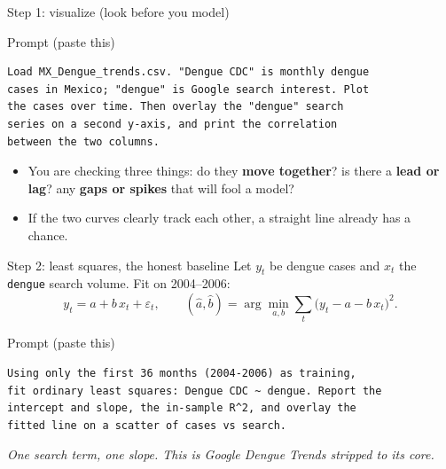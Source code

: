 \documentclass[aspectratio=169,11pt]{beamer}
\begin{document}
\begin{frame}[fragile]{Step 1: visualize (look before you model)}
  \begin{block}{Prompt (paste this)}
  \begin{lstlisting}
Load MX_Dengue_trends.csv. "Dengue CDC" is monthly dengue
cases in Mexico; "dengue" is Google search interest. Plot
the cases over time. Then overlay the "dengue" search
series on a second y-axis, and print the correlation
between the two columns.
  \end{lstlisting}
  \end{block}
  \begin{itemize}
    \item You are checking three things: do they \textbf{move together}? is there a
          \textbf{lead or lag}? any \textbf{gaps or spikes} that will fool a model?
    \item If the two curves clearly track each other, a straight line already has a chance.
  \end{itemize}
\end{frame}

\begin{frame}[fragile]{Step 2: least squares, the honest baseline}
  Let $y_t$ be dengue cases and $x_t$ the \texttt{dengue} search volume. Fit on
  2004--2006:
  \[
    y_t = a + b\,x_t + \varepsilon_t,\qquad
    (\hat a,\hat b)=\arg\min_{a,b}\sum_{t}\bigl(y_t-a-b\,x_t\bigr)^2 .
  \]
  \begin{block}{Prompt (paste this)}
  \begin{lstlisting}
Using only the first 36 months (2004-2006) as training,
fit ordinary least squares: Dengue CDC ~ dengue. Report the
intercept and slope, the in-sample R^2, and overlay the
fitted line on a scatter of cases vs search.
  \end{lstlisting}
  \end{block}
  \begin{center}
    \itshape One search term, one slope. This is Google Dengue Trends stripped to its core.
  \end{center}
\end{frame}
\end{document}
